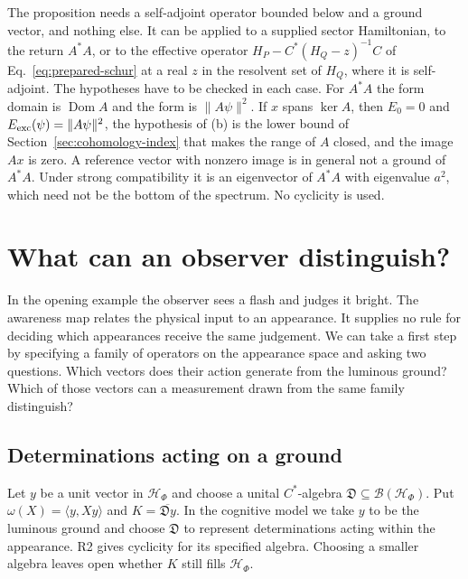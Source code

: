 \documentclass[11pt]{article}
\theoremstyle{definition}
\begin{document}
The proposition needs a self-adjoint operator bounded below and a ground vector, and nothing else. It can be applied to a supplied sector Hamiltonian, to the return $A^*A$, or to the effective operator $H_P-C^*(H_Q-z)^{-1}C$ of Eq.~\eqref{eq:prepared-schur} at a real $z$ in the resolvent set of $H_Q$, where it is self-adjoint. The hypotheses have to be checked in each case. For $A^*A$ the form domain is $\operatorname{Dom}A$ and the form is $\|A\psi\|^2$. If $x$ spans $\ker A$, then $E_0=0$ and $E_{\rm exc}(\psi)=\|A\psi\|^2$, the hypothesis of (b) is the lower bound of Section~\ref{sec:cohomology-index} that makes the range of $A$ closed, and the image $Ax$ is zero. A reference vector with nonzero image is in general not a ground of $A^*A$. Under strong compatibility it is an eigenvector of $A^*A$ with eigenvalue $a^2$, which need not be the bottom of the spectrum. No cyclicity is used.

\section{What can an observer distinguish?}
\label{sec:determination}

In the opening example the observer sees a flash and judges it bright. The awareness map relates the physical input to an appearance. It supplies no rule for deciding which appearances receive the same judgement. We can take a first step by specifying a family of operators on the appearance space and asking two questions. Which vectors does their action generate from the luminous ground? Which of those vectors can a measurement drawn from the same family distinguish?

\subsection{Determinations acting on a ground}
Let $y$ be a unit vector in $\mathcal H_\Phi$ and choose a unital $C^*$-algebra $\mathfrak D\subseteq\mathcal B(\mathcal H_\Phi)$. Put $\omega(X)=\langle y,Xy\rangle$ and $K=\overline{\mathfrak D y}$. In the cognitive model we take $y$ to be the luminous ground and choose $\mathfrak D$ to represent determinations acting within the appearance. R2 gives cyclicity for its specified algebra. Choosing a smaller algebra leaves open whether $K$ still fills $\mathcal H_\Phi$.
\end{document}
